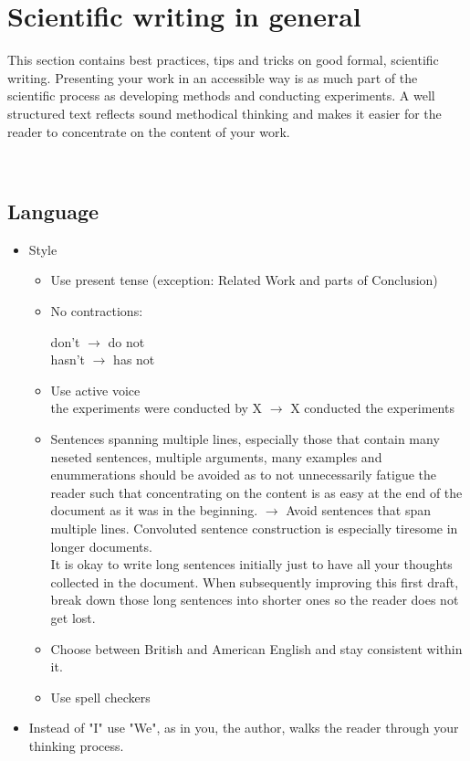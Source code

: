 \documentclass[logo, twocolumn]{mlai-report}
\newcommand{\cmark}{\textcolor[rgb]{0,0.9,0}{\ding{52}}}%
\newcommand{\xmark}{\textcolor[rgb]{0.9,0,0}{\ding{56}}}%
\newcommand{\eg}[2]{ \xmark #1 $\rightarrow$ \cmark #2}
\begin{document}
\section{Scientific writing in general}
This section contains best practices, tips and tricks on good formal, scientific writing. Presenting your work in an accessible way is as much part of the scientific process as developing methods and conducting experiments. A well structured text reflects sound methodical thinking and makes it easier for the reader to concentrate on the content of your work. \cite{zobel_writing}

\

\subsection{Language}
\begin{itemize}

	\item Style
	\begin{itemize}
		\item Use present tense (exception: Related Work and parts of Conclusion)
		\item No contractions:
		\begin{center}
			\eg{don't}{do not}\\
			\eg{hasn't}{has not }
		\end{center}
		\item Use active voice \\\eg{the experiments were conducted by X}{X conducted the experiments}
		\item \eg{Sentences spanning multiple lines, especially those that contain many neseted sentences, multiple arguments, many examples and enummerations should be avoided as to not unnecessarily fatigue the reader such that concentrating on the content is as easy at the end of the document as it was in the beginning.}{Avoid sentences that span multiple lines. Convoluted sentence construction is especially tiresome in longer documents.}\\ It is okay to write long sentences initially just to have all your thoughts collected in the document. When subsequently improving this first draft, break down those long sentences into shorter ones so the reader does not get lost.
		\item Choose between British and American English and stay consistent within it.
		\item Use spell checkers
	\end{itemize}
	\item Instead of "I" use "We", as in you, the author, walks the reader through your thinking process.
\end{itemize}
\end{document}
